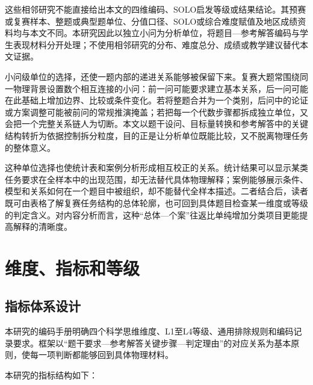 \documentclass[
  12pt,
  a4paper,twoside,openany]{ctexbook}
\begin{document}
这些相邻研究不能直接给出本文的四维编码、SOLO启发等级或结果结论。其预赛或复赛样本、整题或典型题单位、分值口径、SOLO或综合难度赋值及地区成绩资料均与本文不同。本研究因此以独立小问为分析单位，将题目---参考解答编码与学生表现材料分开处理；不使用相邻研究的分布、难度总分、成绩或教学建议替代本文证据。

小问级单位的选择，还使一题内部的递进关系能够被保留下来。复赛大题常围绕同一物理背景设置数个相互连接的小问：前一问可能要求建立基本关系，后一问可能在此基础上增加边界、比较或条件变化。若将整题合并为一个类别，后问中的论证或方案调整可能被前问的常规推演掩盖；若把每一个代数步骤都拆成独立单位，又会把一个完整关系链人为切断。本文以题干设问、目标量转换和参考解答中的关键结构转折为依据控制拆分粒度，目的正是让分析单位既能比较，又不脱离物理任务的整体意义。

这种单位选择也使统计表和案例分析形成相互校正的关系。统计结果可以显示某类任务要求在全样本中的出现范围，却无法替代具体物理解释；案例能够展示条件、模型和关系如何在一个题目中被组织，却不能替代全样本描述。二者结合后，读者既可由表格了解复赛任务结构的总体轮廓，也可回到具体题目检查某一维度或等级的判定含义。对内容分析而言，这种``总体---个案''往返比单纯增加分类项目更能提高解释的清晰度。

\section{维度、指标和等级}\label{ux7ef4ux5ea6ux6307ux6807ux548cux7b49ux7ea7}

\subsection{指标体系设计}\label{ux6307ux6807ux4f53ux7cfbux8bbeux8ba1}

本研究的编码手册明确四个科学思维维度、L1至L4等级、通用排除规则和编码记录要求。框架以``题干要求---参考解答关键步骤---判定理由''的对应关系为基本原则，使每一项判断都能够回到具体物理材料。

本研究的指标结构如下：
\end{document}
